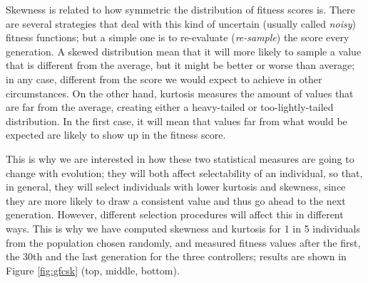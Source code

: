 \documentclass[10pt,journal,compsoc]{IEEEtran}
\begin{document}
Skewness is related to how symmetric the distribution of fitness
scores is. There are several strategies that deal with this kind of
uncertain (usually called {\em noisy}) fitness functions; but a simple
one is to re-evaluate ({\em re-sample}) the score every generation. A
skewed distribution mean that it will more likely to sample a value
that is different from the average, but it might be better or worse
than average; in any case, different from the score we would expect to
achieve in other circumstances. On the other hand, kurtosis measures
the amount of values that are far from the average, creating either a
heavy-tailed or too-lightly-tailed distribution. In the first case, it
will mean that values far from what would be expected are likely to
show up in the fitness score.

This is why we are interested in how these two statistical measures
are going to change with evolution; they will both affect
selectability of an individual, so that, in general, they will select
individuals with lower kurtosis and skewness, since they are more
likely to draw a consistent value and thus go ahead to the next
generation. However, different selection procedures will affect this
in different ways. This is why we have computed skewness and kurtosis for 1 in 5 individuals from the population chosen randomly, and measured fitness values after the first, the 30th and the last generation for the three controllers;
results are shown in Figure \ref{fig:gfcsk} (top, middle, bottom). 
\end{document}
